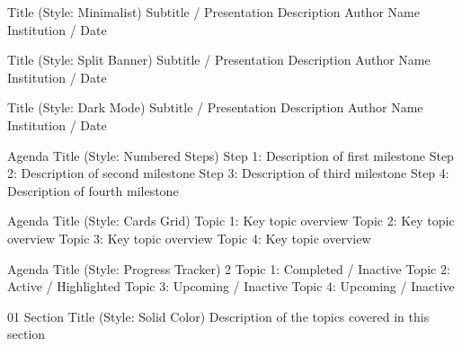 \documentclass[aspectratio=169]{beamer}
\begin{document}

\titleSlideMinimalist
  {Title (Style: Minimalist)} %
  {Subtitle / Presentation Description} %
  {Author Name} %
  {Institution / Date} %

\titleSlideSplit
  {Title (Style: Split Banner)} %
  {Subtitle / Presentation Description} %
  {Author Name} %
  {Institution / Date} %

\titleSlideDarkMode
  {Title (Style: Dark Mode)} %
  {Subtitle / Presentation Description} %
  {Author Name} %
  {Institution / Date} %



\agendaSlideNumbered
  {Agenda Title (Style: Numbered Steps)}
  {Step 1: Description of first milestone}
  {Step 2: Description of second milestone}
  {Step 3: Description of third milestone}
  {Step 4: Description of fourth milestone}

\agendaSlideCards
  {Agenda Title (Style: Cards Grid)}
  {Topic 1: Key topic overview}
  {Topic 2: Key topic overview}
  {Topic 3: Key topic overview}
  {Topic 4: Key topic overview}

\agendaSlideProgress
  {Agenda Title (Style: Progress Tracker)}
  {2} %
  {Topic 1: Completed / Inactive}
  {Topic 2: Active / Highlighted}
  {Topic 3: Upcoming / Inactive}
  {Topic 4: Upcoming / Inactive}



\sectionSlideSolid
  {01} %
  {Section Title (Style: Solid Color)} %
  {Description of the topics covered in this section} %
\end{document}
